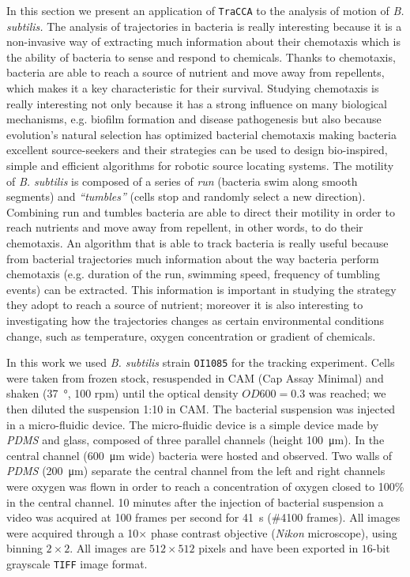 In this section we present an application of \texttt{TraCCA} to the analysis of motion of \textit{B. subtilis.}
The analysis of trajectories in bacteria is really interesting because it is a non-invasive way of extracting much information about their chemotaxis which is the ability of bacteria to sense and respond to chemicals.
Thanks to chemotaxis, bacteria are able to reach a source of nutrient and move away from repellents, which makes it a key characteristic for their survival. Studying chemotaxis is really interesting not only because it has a strong influence on many biological mechanisms, e.g. biofilm formation and disease pathogenesis but also because  evolution's natural selection has optimized bacterial chemotaxis making bacteria excellent source-seekers and their strategies can be used to design bio-inspired, simple and efficient algorithms for robotic source locating systems. 
The motility  of \textit{B. subtilis} is composed of a series of \textit{run} (bacteria swim along smooth segments) and \textit{``tumbles''} (cells stop and randomly select a new direction).
Combining run and tumbles bacteria are able to direct their motility in order to reach nutrients and move away from repellent, in other words, to do their chemotaxis.
An algorithm that is able to track bacteria is really useful  because from bacterial trajectories much information about the way bacteria perform chemotaxis (e.g. duration of the run, swimming speed, frequency of tumbling events) can be extracted. 
This information is important in studying the strategy they adopt to reach a source of nutrient; moreover it is also interesting to investigating how the trajectories changes as certain environmental conditions change, such as temperature, oxygen concentration or gradient of chemicals.


In this work we used \textit{B. subtilis} strain \texttt{OI1085} for the tracking experiment.
Cells were taken from frozen stock, resuspended in CAM (Cap Assay Minimal) and shaken  (\SI{37}{\degree}, 100 rpm) until the optical density $OD600=0.3$ was reached; we then diluted the suspension 1:10 in CAM.
The bacterial suspension was injected in a micro-fluidic device.
The micro-fluidic device is a simple device made by \textit{PDMS} and glass, composed of three parallel channels (height  \SI{100}{\micro\meter}).
In the central channel (\SI{600}{\micro\meter} wide) bacteria were hosted and observed.
Two  walls of \textit{PDMS} (\SI{200}{\micro\metre}) separate the central channel from the left and right channels were oxygen was flown in order to reach a concentration of oxygen closed to 100\% in the central channel.
10 minutes after the injection of bacterial suspension a video was acquired at 100 frames per second for \SI{41}{\second}  (\#4100 frames). All images were acquired through a 10$\times$ phase contrast objective (\textit{Nikon} microscope), using binning $2 \times 2$.
All images are $512 \times 512$ pixels and have been exported in $16$-bit grayscale \texttt{TIFF} image format.

